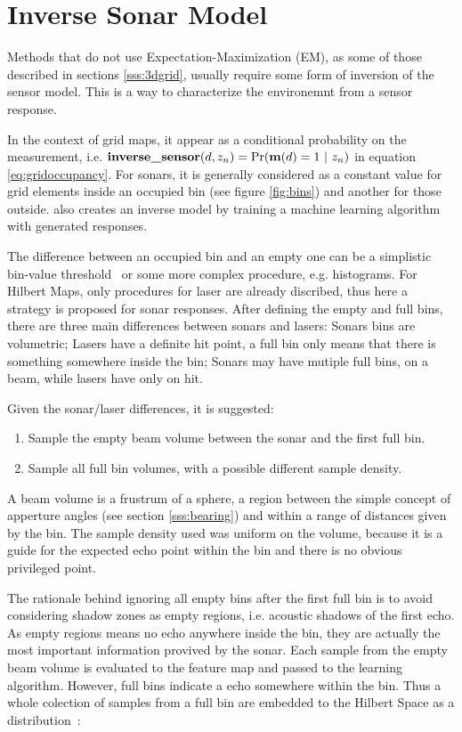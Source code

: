 \section{Inverse Sonar Model}

Methods that do not use Expectation-Maximization (EM), as some of those
described in sections \ref{sss:3dgrid}, usually require some form of inversion
of the sensor model. This is a way to characterize the environemnt from a sensor
response.

In the context of grid maps, it appear as a conditional probability on the
measurement, i.e.
$\text{\textbf{inverse\_sensor}}(d,z_n)=\Pr(\mathrm{\mathbf{m}}(d)=1~|~z_n)$ in equation
\ref{eq:gridoccupancy}. For sonars, it is generally considered as a constant
value for grid elements inside an occupied bin (see figure \ref{fig:bins}) and
another for those outside\cite{thrunprob}. \citet{thrunprob} also creates an
inverse model by training a machine learning algorithm with generated responses.

The difference between an occupied bin and an empty one can be a simplistic
bin-value threshold~\cite{ribas2010underwater,Moravec1985,thrunprob} or some
more complex procedure, e.g. histograms. For Hilbert Maps, only procedures for
laser are already discribed, thus here a strategy is proposed for sonar
responses. After defining the empty and full bins, there are three main
differences between sonars and lasers: Sonars bins are volumetric; Lasers have a
definite hit point, a full bin only means that there is something somewhere
inside the bin; Sonars may have mutiple full bins, on a beam, while lasers have
only on hit.

Given the sonar/laser differences, it is suggested:
\begin{enumerate}[I]
  \item Sample the empty beam volume between the sonar and the first full bin.
  \item Sample all full bin volumes, with a possible different sample density. 
\end{enumerate}

A beam volume is a frustrum of a sphere, a region between the simple concept of
apperture angles (see section \ref{sss:bearing}) and within a range of distances
given by the bin. The sample density used was uniform on the volume, because
it is a guide for the expected echo point within the bin and there is no obvious
privileged point.

The rationale behind ignoring all empty bins after the first full bin is to
avoid considering shadow zones as empty regions, i.e. acoustic shadows of the
first echo. As empty regions means no echo anywhere inside the bin, they are
actually the most important information provived by the sonar. Each sample from
the empty beam volume is evaluated to the feature map and passed to the learning
algorithm. However, full bins indicate a echo somewhere within the bin. Thus
a whole colection of samples from a full bin are embedded to the Hilbert Space
as a distribution~\cite{song2013kernel,ramos2016hilbert}:

